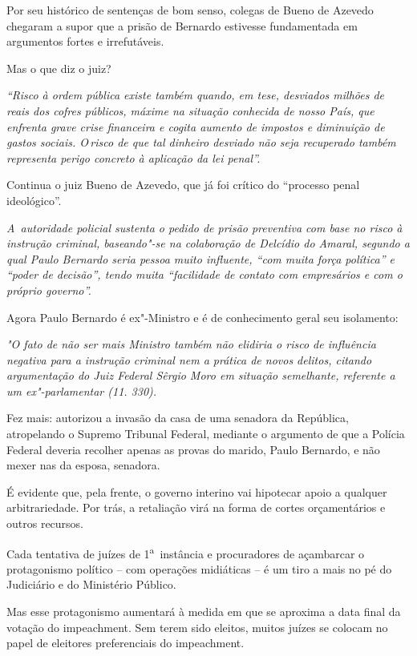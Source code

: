 Por seu histórico de sentenças de bom senso, colegas de Bueno de Azevedo
chegaram a supor que a prisão de Bernardo estivesse fundamentada em
argumentos fortes e irrefutáveis.

Mas o que diz o juiz?

\emph{``Risco à ordem pública existe também quando, em tese, desviados
milhões de reais dos cofres públicos, máxime na situação conhecida de
nosso País, que enfrenta grave crise financeira e cogita aumento de
impostos e diminuição de gastos sociais. \redondo{[…]} O\,risco de que
tal dinheiro desviado não seja recuperado também representa perigo
concreto à aplicação da lei penal''.}

Continua o juiz Bueno de Azevedo, que já foi crítico do ``processo penal
ideológico''.

\emph{A~autoridade policial sustenta o pedido de prisão preventiva com
base no risco à instrução criminal, baseando"-se na colaboração de
Delcídio do Amaral, segundo a qual Paulo Bernardo seria pessoa muito
influente, ``com muita força política'' e ``poder de decisão'', tendo
muita ``facilidade de contato com empresários e com o próprio
governo''.}

Agora Paulo Bernardo é ex"-Ministro e é de conhecimento geral seu
isolamento:

\emph{"O fato de   não ser mais Ministro também não
elidiria o risco de influência negativa para a instrução criminal nem a
prática de novos delitos, citando argumentação do Juiz Federal Sêrgio
Moro em situação semelhante, referente a um ex"-parlamentar (11. 330).}

Fez mais: autorizou a invasão da casa de uma senadora da República,
atropelando o Supremo Tribunal Federal, mediante o argumento de que a
Polícia Federal deveria recolher apenas as provas do marido, Paulo
Bernardo, e não mexer nas da esposa, senadora.

É evidente que, pela frente, o governo interino vai hipotecar apoio a
qualquer arbitrariedade. Por trás, a retaliação virá na forma de cortes
orçamentários e outros recursos.

Cada tentativa de juízes de 1\textsuperscript{a}~instância e
procuradores de açambarcar o protagonismo político -- com operações
midiáticas -- é um tiro a mais no pé do Judiciário e do Ministério
Público.

Mas esse protagonismo aumentará à medida em que se aproxima a data final
da votação do impeachment. Sem terem sido eleitos, muitos juízes se
colocam no papel de eleitores preferenciais do impeachment.

